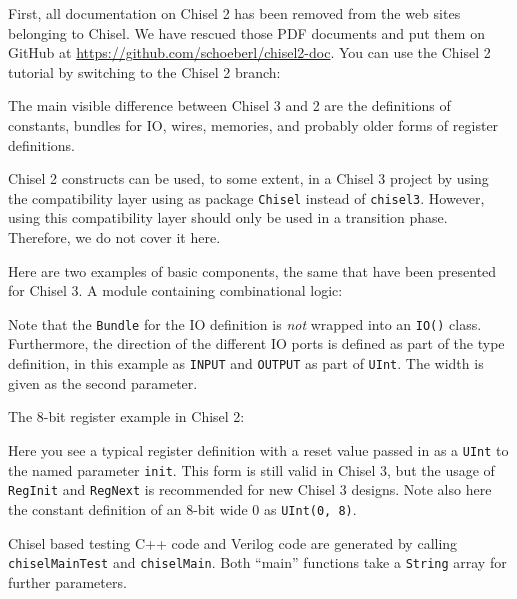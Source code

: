 \documentclass[%
    10pt,
    headinclude, footexclude,
    openright, %
    notitlepage,
    cleardoubleempty,
    headsepline,
    pointlessnumbers,
    bibtotoc, idxtotoc,
    ]{scrbook}
\newcommand{\code}[1]{{\small{\texttt{#1}}}}
\begin{document}
First, all documentation on Chisel 2 has been removed from the web sites
belonging to Chisel. We have rescued those PDF documents and put them
on GitHub at \url{https://github.com/schoeberl/chisel2-doc}.
You can use the Chisel 2 tutorial by switching to the Chisel 2 branch:


The main visible difference between Chisel 3 and 2 are the definitions of
constants, bundles for IO, wires, memories, and probably older forms of register
definitions.

Chisel 2 constructs can be used, to some extent, in a Chisel 3 project by
using the compatibility layer using as package \code{Chisel} instead of \code{chisel3}.
However, using this compatibility layer should only be used in a transition phase.
Therefore, we do not cover it here.

Here are two examples of basic components, the same that have been presented
for Chisel 3. A module containing combinational logic:


Note that the \code{Bundle} for the IO definition is \emph{not} wrapped into
an \code{IO()} class.  Furthermore, the direction of the different IO ports is defined
as part of the type definition, in this example as \code{INPUT} and \code{OUTPUT}
as part of \code{UInt}. The width is given as the second parameter.

\begin{minipage}{\linewidth}
The 8-bit register example in Chisel 2:

\end{minipage}

Here you see a typical register definition with a reset value passed in as
a \code{UInt} to the named parameter \code{init}. This form is still valid in Chisel 3,
but the usage of \code{RegInit} and \code{RegNext} is recommended for new Chisel 3 designs.
Note also here the constant definition of an 8-bit wide 0 as \code{UInt(0, 8)}.

Chisel based testing C++ code and Verilog code are generated by calling \code{chiselMainTest}
and \code{chiselMain}. Both ``main'' functions take a \code{String} array for further parameters.
\end{document}
